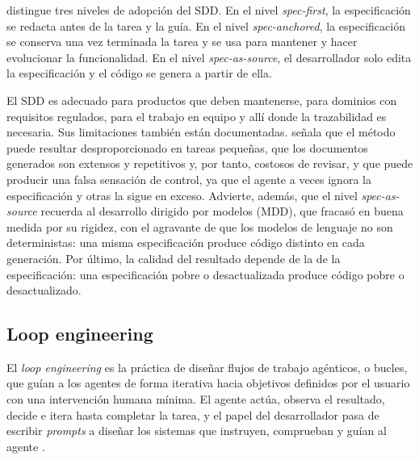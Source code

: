 \citet{bockeler2025sdd} distingue tres niveles de adopción del SDD. En el nivel \emph{spec-first}, la especificación se redacta antes de la tarea y la guía. En el nivel \emph{spec-anchored}, la especificación se conserva una vez terminada la tarea y se usa para mantener y hacer evolucionar la funcionalidad. En el nivel \emph{spec-as-source}, el desarrollador solo edita la especificación y el código se genera a partir de ella.

El SDD es adecuado para productos que deben mantenerse, para dominios con requisitos regulados, para el trabajo en equipo y allí donde la trazabilidad es necesaria. Sus limitaciones también están documentadas. \citet{bockeler2025sdd} señala que el método puede resultar desproporcionado en tareas pequeñas, que los documentos generados son extensos y repetitivos y, por tanto, costosos de revisar, y que puede producir una falsa sensación de control, ya que el agente a veces ignora la especificación y otras la sigue en exceso. Advierte, además, que el nivel \emph{spec-as-source} recuerda al desarrollo dirigido por modelos (MDD), que fracasó en buena medida por su rigidez, con el agravante de que los modelos de lenguaje no son deterministas: una misma especificación produce código distinto en cada generación. Por último, la calidad del resultado depende de la de la especificación: una especificación pobre o desactualizada produce código pobre o desactualizado.

\subsection{Loop engineering}\label{subsec:LoopEngineering}

El \emph{loop engineering} es la práctica de diseñar flujos de trabajo agénticos, o bucles, que guían a los agentes de forma iterativa hacia objetivos definidos por el usuario con una intervención humana mínima. El agente actúa, observa el resultado, decide e itera hasta completar la tarea, y el papel del desarrollador pasa de escribir \emph{prompts} a diseñar los sistemas que instruyen, comprueban y guían al agente \citep{belcic2026loop}.

